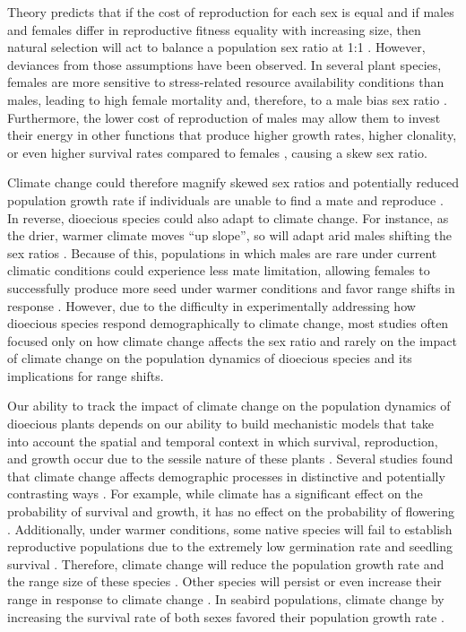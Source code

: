 \documentclass[11pt]{article}
\begin{document}
Theory predicts that if the cost of reproduction for each sex is equal and if males and females differ in reproductive fitness equality with increasing size, then natural selection will act to balance a population sex ratio at 1:1 \citep{Fisher1930}. However, deviances from those assumptions have been observed.
In several plant species, females are more sensitive to stress-related resource availability conditions than males, leading to high female mortality and, therefore, to a male bias sex ratio \citep{hultine2016climate}. 
Furthermore, the lower cost of reproduction of males may allow them to invest their energy in other functions that produce higher growth rates, higher clonality, or even higher survival rates compared to females \citep{bruijning2017surviving}, causing a skew sex ratio.

Climate change could therefore magnify skewed sex ratios and potentially reduced population growth rate if individuals are unable to find a mate and reproduce \citep{morrison2016causes}.
In reverse, dioecious species could also adapt to climate change. 
For instance, as the drier, warmer climate moves “up slope”, so will adapt arid males shifting the sex ratios \citep{petry2016sex}.
Because of this, populations in which males are rare under current climatic conditions could experience less mate limitation, allowing females to successfully produce more seed under warmer conditions  and favor range shifts in response \citep{petry2016sex}.
However, due to the difficulty in experimentally addressing how dioecious species respond demographically to climate change, most studies often focused only on how climate change affects the sex ratio and rarely on the impact of climate change on the population dynamics of dioecious species and its implications for range shifts.

Our ability to track the impact of climate change on the population dynamics of dioecious plants depends on our ability to build mechanistic models that take into account the spatial and temporal context in which survival, reproduction, and growth occur due to the sessile nature of these plants \citep{czachura2020demographic}.
Several studies found that climate change affects demographic processes in distinctive and potentially contrasting ways \citep{dalgleish2011climate}. For example, while climate has a significant effect on the probability of survival and growth, it has no effect on the probability of flowering \citep{greiser2020climate}. Additionally, under warmer conditions, some native species will fail to establish reproductive populations due to the extremely low germination rate and seedling survival \citep{Reed2021}. Therefore, climate change will reduce the population growth rate and the range size of these species \citep{reed2021climate}. 
Other species will persist or even increase their range in response to climate change \citep{williams2015life,merow2017climate}. 
In seabird populations, climate change by increasing the survival rate of both sexes favored their population growth rate \citep{gianuca2019sex}.
\end{document}
